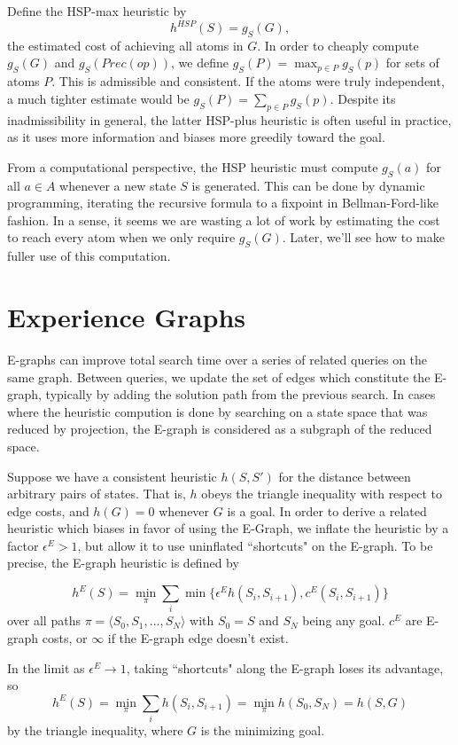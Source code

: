 \documentclass[letterpaper]{article}
\begin{document}
Define the HSP-max heuristic by \[h^{HSP}(S) = g_S(G),\] the estimated cost of achieving all atoms in $G$. In order to cheaply compute $g_S(G)$ and $g_S(Prec(op))$, we define $g_S(P) = \max_{p\in P} g_S(p)$ for sets of atoms $P$. This is admissible and consistent. If the atoms were truly independent, a much tighter estimate would be $g_S(P) = \sum_{p\in P} g_S(p)$. Despite its inadmissibility in general, the latter HSP-plus heuristic is often useful in practice, as it uses more information and biases more greedily toward the goal.

From a computational perspective, the HSP heuristic must compute $g_S(a)$ for all $a\in A$ whenever a new state $S$ is generated. This can be done by dynamic programming, iterating the recursive formula to a fixpoint in Bellman-Ford-like fashion. In a sense, it seems we are wasting a lot of work by estimating the cost to reach every atom when we only require $g_S(G)$. Later, we'll see how to make fuller use of this computation.

\section{Experience Graphs}

E-graphs can improve total search time over a series of related queries on the same graph.
Between queries, we update the set of edges which constitute the E-graph, typically by adding the solution path from the previous search.
In cases where the heuristic compution is done by searching on a state space that was reduced by projection, the E-graph is considered as a subgraph of the reduced space.

Suppose we have a consistent heuristic $h(S,S')$ for the distance between arbitrary pairs of states. That is, $h$ obeys the triangle inequality with respect to edge costs, and $h(G) = 0$ whenever $G$ is a goal. In order to derive a related heuristic which biases in favor of using the E-Graph, we inflate the heuristic by a factor $\epsilon^E > 1$, but allow it to use uninflated ``shortcuts" on the E-graph. To be precise, the E-graph heuristic is defined by

\[h^E(S) = \min_\pi \sum_i \min \{\epsilon^E h(S_i,S_{i+1}),c^E(S_i,S_{i+1})\}\]
over all paths $\pi = \langle S_0,S_1,...,S_N \rangle$ with $S_0 = S$ and $S_N$ being any goal. $c^E$ are E-graph costs, or $\infty$ if the E-graph edge doesn't exist.

In the limit as $\epsilon^E \rightarrow 1$, taking ``shortcuts" along the E-graph loses its advantage, so \[h^E(S) = \min_\pi \sum_i h(S_i,S_{i+1}) = \min_\pi h(S_0,S_N) = h(S,G)\]
by the triangle inequality, where $G$ is the minimizing goal.
\end{document}
